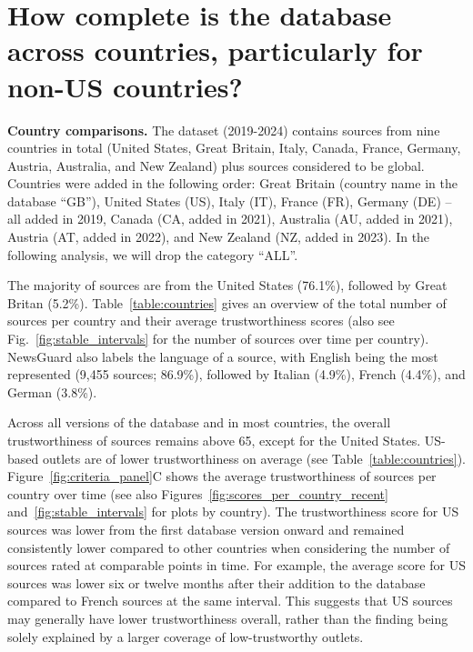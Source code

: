 \documentclass[12pt,twoside]{article}
\begin{document}
\section{How complete is the database across countries, particularly for non-US countries?}
\textbf{Country comparisons.} The dataset (2019-2024) contains sources from nine countries in total (United States, Great Britain, Italy, Canada, France, Germany, Austria, Australia, and New Zealand) plus sources considered to be global. 
Countries were added in the following order: Great Britain (country name in the database ``GB''), United States (US), Italy (IT), France (FR), Germany (DE) -- all added in 2019, Canada (CA, added in 2021), Australia (AU, added in 2021), Austria (AT, added in 2022), and New Zealand (NZ, added in 2023). 
In the following analysis, we will drop the category ``ALL''.

The majority of sources are from the United States (76.1\%), followed by Great Britan (5.2\%). 
Table~\ref{table:countries} gives an overview of the total number of sources per country and their average trustworthiness scores (also see Fig.~\ref{fig:stable_intervals} for the number of sources over time per country). 
NewsGuard also labels the language of a source, with English being the most represented (9,455 sources; 86.9\%), followed by Italian (4.9\%), French (4.4\%), and German (3.8\%).



Across all versions of the database and in most countries, the overall trustworthiness of sources remains above 65, except for the United States. 
US-based outlets are of lower trustworthiness on average (see Table~\ref{table:countries}). 
Figure~\ref{fig:criteria_panel}C shows the average trustworthiness of sources per country over time (see also Figures~\ref{fig:scores_per_country_recent} and~\ref{fig:stable_intervals} for plots by country). 
The trustworthiness score for US sources was lower from the first database version onward and remained consistently lower compared to other countries when considering the number of sources rated at comparable points in time.
For example, the average score for US sources was lower six or twelve months after their addition to the database compared to French sources at the same interval.
This suggests that US sources may generally have lower trustworthiness overall, rather than the finding being solely explained by a larger coverage of low-trustworthy outlets. 
\end{document}
